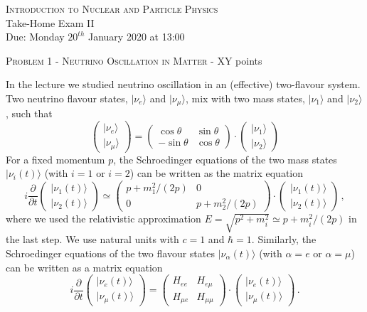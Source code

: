 \documentclass[a4paper,11pt]{report}
\begin{document}
\begin{center}
{\large \textsc{Introduction to Nuclear and Particle Physics}} \\[0.5cm]
\Large{Take-Home Exam II\\
Due: Monday $20^{th}$ January 2020 at 13:00}
\end{center}

{\large \textsc{Problem 1 - Neutrino Oscillation in Matter} - XY points}

In the lecture we studied neutrino oscillation in an (effective) two-flavour system. Two neutrino flavour states, $|\nu_e\rangle$ and $|\nu_\mu\rangle$, mix with two mass states, $|\nu_1\rangle$ and $|\nu_2\rangle$, such that
\[
\begin{pmatrix}|\nu_e\rangle\\|\nu_\mu\rangle\end{pmatrix} = \begin{pmatrix}\cos\theta&\sin\theta\\-\sin\theta&\cos\theta\end{pmatrix}\cdot\begin{pmatrix}|\nu_1\rangle\\|\nu_2\rangle\end{pmatrix}
\]
For a fixed momentum $p$, the Schroedinger equations of the two mass states $|\nu_i(t)\rangle$ (with $i=1$ or $i=2$) can be written as the matrix equation
\begin{equation}\label{eq:ex1a}
i\frac{\partial}{\partial t}\begin{pmatrix}|\nu_1(t)\rangle\\|\nu_2(t)\rangle\end{pmatrix} \simeq \begin{pmatrix}p + {m_1^2}/(2p)&0\\0&p + {m_2^2}/(2p)\end{pmatrix}\cdot\begin{pmatrix}|\nu_1(t)\rangle\\|\nu_2(t)\rangle\end{pmatrix}\,,
\end{equation}
where we used the relativistic approximation $E=\sqrt{p^2+m_i^2} \simeq p+m_i^2/(2p)$ in the last step. We use natural units with $c=1$ and $\hbar=1$. Similarly, the Schroedinger equations of the two flavour states $|\nu_\alpha(t)\rangle$ (with $\alpha=e$ or $\alpha=\mu$) can be written as a matrix equation
\begin{equation}\label{eq:ex1b}
i\frac{\partial}{\partial t}\begin{pmatrix}|\nu_e(t)\rangle\\|\nu_\mu(t)\rangle\end{pmatrix} = \begin{pmatrix}H_{ee}&H_{e\mu}\\H_{\mu e}&H_{\mu\mu}\end{pmatrix}\cdot\begin{pmatrix}|\nu_e(t)\rangle\\|\nu_\mu(t)\rangle\end{pmatrix}\,.
\end{equation}
\end{document}
